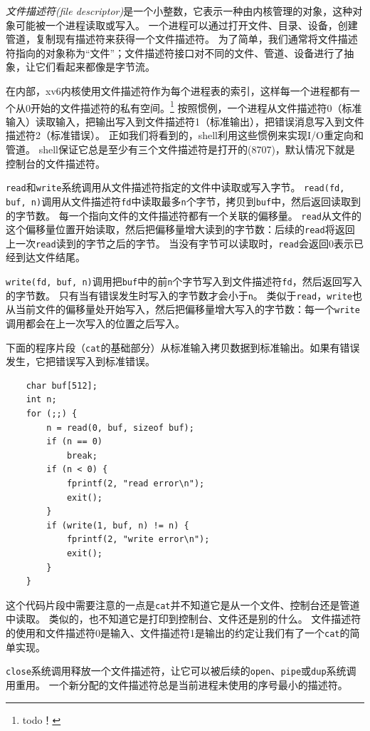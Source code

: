 \emph{文件描述符(file descriptor)}是一个小整数，它表示一种由内核管理的对象，这种对象可能被一个进程读取或写入。
一个进程可以通过打开文件、目录、设备，创建管道，复制现有描述符来获得一个文件描述符。
为了简单，我们通常将文件描述符指向的对象称为“文件”；文件描述符接口对不同的文件、管道、设备进行了抽象，让它们看起来都像是字节流。

在内部，xv6内核使用文件描述符作为每个进程表的索引，这样每一个进程都有一个从0开始的文件描述符的私有空间。\footnote{todo！}
按照惯例，一个进程从文件描述符0（标准输入）读取输入，把输出写入到文件描述符1（标准输出），把错误消息写入到文件描述符2（标准错误）。
正如我们将看到的，shell利用这些惯例来实现I/O重定向和管道。
shell保证它总是至少有三个文件描述符是打开的(8707)，默认情况下就是控制台的文件描述符。

\texttt{read}和\texttt{write}系统调用从文件描述符指定的文件中读取或写入字节。
\texttt{read(fd, buf, n)}调用从文件描述符\texttt{fd}中读取最多\texttt{n}个字节，拷贝到\texttt{buf}中，然后返回读取到的字节数。
每一个指向文件的文件描述符都有一个关联的偏移量。
\texttt{read}从文件的这个偏移量位置开始读取，然后把偏移量增大读到的字节数：后续的\texttt{read}将返回上一次\texttt{read}读到的字节之后的字节。
当没有字节可以读取时，\texttt{read}会返回0表示已经到达文件结尾。

\texttt{write(fd, buf, n)}调用把\texttt{buf}中的前\texttt{n}个字节写入到文件描述符\texttt{fd}，然后返回写入的字节数。
只有当有错误发生时写入的字节数才会小于\texttt{n}。
类似于\texttt{read}，\texttt{write}也从当前文件的偏移量处开始写入，然后把偏移量增大写入的字节数：每一个\texttt{write}调用都会在上一次写入的位置之后写入。

下面的程序片段（\texttt{cat}的基础部分）从标准输入拷贝数据到标准输出。如果有错误发生，它把错误写入到标准错误。
\begin{lstlisting}
    char buf[512];
    int n;
    for (;;) {
        n = read(0, buf, sizeof buf);
        if (n == 0)
            break;
        if (n < 0) {
            fprintf(2, "read error\n");
            exit();
        }
        if (write(1, buf, n) != n) {
            fprintf(2, "write error\n");
            exit();
        }
    }
\end{lstlisting}

这个代码片段中需要注意的一点是\texttt{cat}并不知道它是从一个文件、控制台还是管道中读取。
类似的，也不知道它是打印到控制台、文件还是别的什么。
文件描述符的使用和文件描述符0是输入、文件描述符1是输出的约定让我们有了一个\texttt{cat}的简单实现。

\texttt{close}系统调用释放一个文件描述符，让它可以被后续的\texttt{open}、\texttt{pipe}或\texttt{dup}系统调用重用。
一个新分配的文件描述符总是当前进程未使用的序号最小的描述符。

